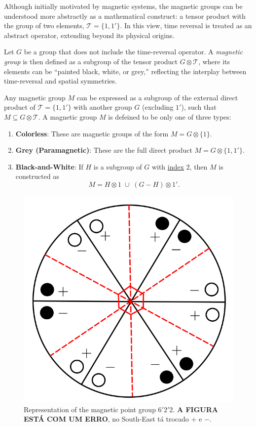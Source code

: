 \documentclass[12pt]{report}
\begin{document}
Although initially motivated by magnetic systems, the magnetic groups can be understood more abstractly as a mathematical construct: a tensor product with the group of two elements, \(\mathcal{T} = \{1, 1'\}\). In this view, time reversal is treated as an abstract operator, extending beyond its physical origins. %

Let \(G\) be a group that does not include the time-reversal operator. A \textit{magnetic group} is then defined as a subgroup of the tensor product \(G \otimes \mathcal{T}\), where its elements can be ``painted black, white, or grey,'' reflecting the interplay between time-reversal and spatial symmetries.

\begin{definition} \label{def:magnetic_group}
Any magnetic group \( M \) can be expressed as a subgroup of the external direct product of \( \mathcal{T} = \{1, 1'\}\) with another group \( G \) (excluding \( 1' \)), such that \( M \subseteq G \otimes \mathcal{T} \). A magnetic group $M$ is defeined to be only one of three types:
\begin{enumerate}
\item \textbf{Colorless}: These are magnetic groups of the form \(M =  G \otimes \{1\} \).

\item \textbf{Grey (Paramagnetic)}: These are the full direct product \(M = G \otimes \{1, 1'\} \).

\item \textbf{Black-and-White}: If \( H \) is a subgroup of \( G \) with \hyperref[def:left_cosets]{index} \(2\), then \( M \) is constructed as
\begin{equation} \label{eq:magnetic_black_white_def}
M = H \otimes 1 \; \cup \; (G - H) \otimes 1'.
\end{equation}
\end{enumerate}
\end{definition}

\begin{figure}[H]
\centering
\includegraphics[width=0.5\linewidth]{fig/622_magnetic.png}
\caption{Representation of the magnetic point group $6'2'2$. \textbf{A FIGURA ESTÁ COM UM ERRO}, no South-East tá trocado $+$ e $-$.}
\label{fig:622_magnetic}
\end{figure}
\end{document}
